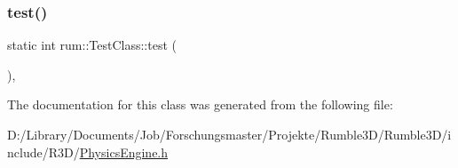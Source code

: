 \subsubsection{\texorpdfstring{test()}{test()}}
{\footnotesize\ttfamily static int rum\+::\+Test\+Class\+::test (\begin{DoxyParamCaption}{ }\end{DoxyParamCaption})\hspace{0.3cm}{\ttfamily [inline]}, {\ttfamily [static]}}



The documentation for this class was generated from the following file\+:\begin{DoxyCompactItemize}
\item 
D\+:/\+Library/\+Documents/\+Job/\+Forschungsmaster/\+Projekte/\+Rumble3\+D/\+Rumble3\+D/include/\+R3\+D/\mbox{\hyperlink{_physics_engine_8h}{Physics\+Engine.\+h}}\end{DoxyCompactItemize}
